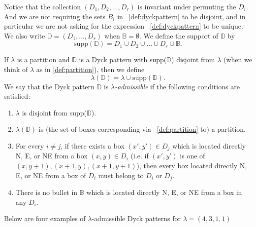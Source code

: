 \documentclass[12pt]{amsart}
\theoremstyle{definition}
\theoremstyle{remark}
\newcommand{\bbB}{\mathbb{B}}
\newcommand{\bbD}{\mathbb{D}}
\numberwithin{equation}{section}
\begin{document}
Notice that the collection $(D_1,D_2,\ldots,D_r)$ is invariant under permuting the $D_i$. And we are not requiring the sets $B_i$ in ~\ref{def:dyckpattern} to be disjoint, and in particular we are not asking for the expression ~\ref{def:dyckpattern} to be unique. We also write $\bbD = (D_1,\ldots,D_r)$ when $\bbB = \emptyset$. We define the support of $\bbD$ by
\begin{equation} \label{def:suppD}
    \text{supp}(\bbD) = D_1 \cup D_2 \cup \ldots \cup D_r \cup \bbB.
\end{equation}

If $\lambda$ is a partition and $\bbD$ is a Dyck pattern with supp($\bbD$) disjoint from $\lambda$ (when we think of $\lambda$ as in \ref{def:partition}), then we define
\begin{equation} \label{def:lambdaD}
    \lambda(\bbD) = \lambda \cup \text{supp}(\bbD).
\end{equation}
We say that the Dyck pattern $\bbD$ is \emph{$\lambda$-admissible} if the following conditions are satisfied:
\begin{enumerate}
    \item $\lambda$ is disjoint from supp($\bbD$).
    \item $\lambda(\bbD)$ is (the set of boxes corresponding via ~\ref{def:partition} to) a partition.
    \item For every $i \neq j$, if there exists a box $(x',y') \in D_j$ which is located directly N, E, or NE from a box $(x,y) \in D_i$ (i.e. if $(x',y')$ is one of $(x,y+1),(x+1,y),(x+1,y+1)$), then every box located directly N, E, or NE from a box of $D_i$ must belong to $D_i$ or $D_j$.
    \item There is no bullet in $\bbB$ which is located directly N, E, or NE from a box in any $D_i$.
\end{enumerate}
Below are four examples of $\lambda$-admissible Dyck patterns for $\lambda = (4,3,1,1)$
\end{document}

